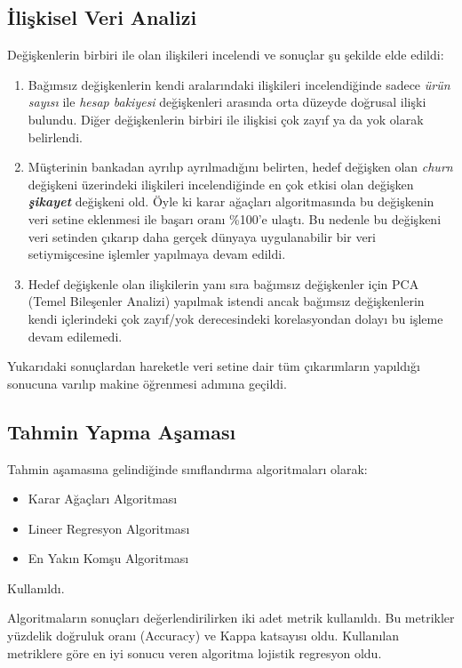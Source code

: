 \documentclass{article}
\begin{document}
\subsection{İlişkisel Veri Analizi}
Değişkenlerin birbiri ile olan ilişkileri incelendi ve sonuçlar şu şekilde elde edildi:
\begin{enumerate}
    \item Bağımsız değişkenlerin kendi aralarındaki ilişkileri incelendiğinde sadece \textit{ürün sayısı} ile \textit{hesap bakiyesi} değişkenleri arasında orta düzeyde doğrusal ilişki bulundu. 
    Diğer değişkenlerin birbiri ile ilişkisi çok zayıf ya da yok olarak belirlendi.
    \item Müşterinin bankadan ayrılıp ayrılmadığını belirten, hedef değişken olan \textit{churn} değişkeni üzerindeki ilişkileri incelendiğinde en çok etkisi olan değişken \textit{\textbf{şikayet}} değişkeni old. Öyle ki karar ağaçları algoritmasında bu değişkenin veri setine eklenmesi ile başarı oranı \%100'e ulaştı.
    Bu nedenle bu değişkeni veri setinden çıkarıp daha gerçek dünyaya uygulanabilir bir veri setiymişcesine işlemler yapılmaya devam edildi.
    \item Hedef değişkenle olan ilişkilerin yanı sıra bağımsız değişkenler için PCA (Temel Bileşenler Analizi) yapılmak istendi ancak bağımsız değişkenlerin kendi içlerindeki çok zayıf/yok derecesindeki korelasyondan dolayı bu işleme devam edilemedi.
\end{enumerate}

Yukarıdaki sonuçlardan hareketle veri setine dair tüm çıkarımların yapıldığı sonucuna varılıp makine öğrenmesi adımına geçildi.

\subsection{Tahmin Yapma Aşaması}
Tahmin aşamasına gelindiğinde sınıflandırma algoritmaları olarak:
\begin{itemize}
    \item Karar Ağaçları Algoritması
    \item Lineer Regresyon Algoritması
    \item En Yakın Komşu Algoritması
\end{itemize}
Kullanıldı.

Algoritmaların sonuçları değerlendirilirken iki adet metrik kullanıldı. Bu metrikler yüzdelik doğruluk oranı (Accuracy) ve Kappa katsayısı oldu. Kullanılan metriklere göre en iyi sonucu veren algoritma lojistik regresyon oldu.
\end{document}
